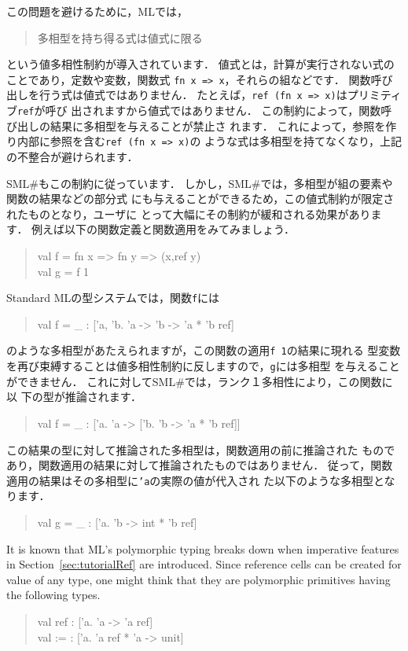 \documentclass{jbook}
\newcommand{\smlsharp}{SML\#}
\newenvironment{program}{\begin{tt}\begin{quote}}{\end{quote}\end{tt}}
\begin{document}
	この問題を避けるために，MLでは，
\begin{quote}
多相型を持ち得る式は値式に限る
\end{quote}
という値多相性制約が導入されています．
	値式とは，計算が実行されない式のことであり，定数や変数，関数式
{\tt fn x => x}，それらの組などです．
	関数呼び出しを行う式は値式ではありません．
	たとえば，{\tt ref (fn x => x)}はプリミティブ{\tt ref}が呼び
出されますから値式ではありません．
	この制約によって，関数呼び出しの結果に多相型を与えることが禁止さ
れます．
	これによって，参照を作り内部に参照を含む{\tt ref (fn x => x)}の
ような式は多相型を持てなくなり，上記の不整合が避けられます．

	\smlsharp{}もこの制約に従っています．
	しかし，\smlsharp{}では，多相型が組の要素や関数の結果などの部分式
にも与えることができるため，この値式制約が限定されたものとなり，ユーザに
とって大幅にその制約が緩和される効果があります．
	例えば以下の関数定義と関数適用をみてみましょう．
\begin{program}
val f = fn x => fn y => (x,ref y)\\
val g = f 1\\
\end{program}
	Standard MLの型システムでは，関数{\tt f}には
\begin{program}
val f = \_ : ['a, 'b. 'a -> 'b -> 'a * 'b ref]
\end{program}
のような多相型があたえられますが，この関数の適用{\tt f 1}の結果に現れる
型変数を再び束縛することは値多相性制約に反しますので，{\tt g}には多相型
を与えることができません．
	これに対して\smlsharp{}では，ランク１多相性により，この関数に以
下の型が推論されます．
\begin{program}
val f = \_ : ['a. 'a -> ['b. 'b -> 'a * 'b ref]]
\end{program}
	この結果の型に対して推論された多相型は，関数適用の前に推論された
ものであり，関数適用の結果に対して推論されたものではありません．
	従って，関数適用の結果はその多相型に{\tt 'a}の実際の値が代入され
た以下のような多相型となります．
\begin{program}
val g = \_ :  ['a. 'b -> int * 'b ref]
\end{program}
\else%
	It is known that ML's polymorphic typing breaks down when 
imperative features in Section~\ref{sec:tutorialRef} are introduced.
	Since reference cells can be created for value of any type,
one might think that they are polymorphic primitives having the
following types.
\begin{program}
val ref : ['a. 'a -> 'a ref]\\
val := :  ['a. 'a ref * 'a -> unit]
\end{program}
\end{document}
